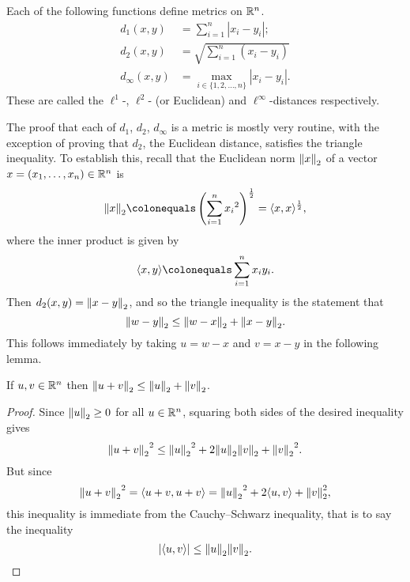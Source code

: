 \begin{example}[Metrics on $\RR^n$]
Each of the following functions define metrics on $\RR^n$.
\begin{align*}
d_1(x,y)&=\sum_{i=1}^{n}|x_i-y_i|;\\
d_2(x,y)&=\sqrt{\sum_{i=1}^{n}(x_i-y_i)}\\
d_\infty(x,y)&=\max_{i\in\{1,2,\dots,n\}}|x_i-y_i|.
\end{align*}
These are called the $\ell^1$-, $\ell^2$- (or Euclidean) and $\ell^\infty$-distances respectively.

The proof that each of $d_1$, $d_2$, $d_\infty$ is a metric is mostly very routine, with the exception of proving that $d_2$, the Euclidean distance, satisfies the triangle inequality. To establish this, recall that the Euclidean norm $\norm{x}_2$ of a vector $x=(x_1,\dots,x_n)\in\mathbb R^n$ is
\[\norm{x}_2\colonequals\brac{\sum_{i=1}^n{x_i}^2}^\frac{1}{2}=\langle x,x\rangle^\frac{1}{2},\]
where the inner product is given by
\[\langle x,y\rangle\colonequals\sum_{i=1}^{n}x_i y_i.\]
Then $d_2(x,y)=\norm{x-y}_2$, and so the triangle inequality is the statement that
\[\norm{w-y}_2\le\norm{w-x}_2+\norm{x-y}_2.\]
This follows immediately by taking $u=w-x$ and $v=x-y$ in the following lemma.

\begin{lemma*}
If $u,v\in\mathbb R^n$ then $\norm{u+v}_2\le\norm{u}_2+\norm{v}_2$.
\end{lemma*}

\begin{proof}
Since $\norm{u}_2\ge0$ for all $u\in\mathbb R^n$, squaring both sides of the desired inequality gives
\[{\norm{u+v}_2}^2\le{\norm{u}_2}^2+2\norm{u}_2\norm{v}_2+{\norm{v}_2}^2.\]
But since
\[{\norm{u+v}_2}^2=\langle u+v,u+v\rangle={\norm{u}_2}^2+2\langle u,v\rangle+\norm{v}_2^2,\]
this inequality is immediate from the Cauchy--Schwarz inequality, that is to say the inequality
\[|\langle u,v\rangle|\le\norm{u}_2\norm{v}_2.\]
\end{proof}
\end{example}

